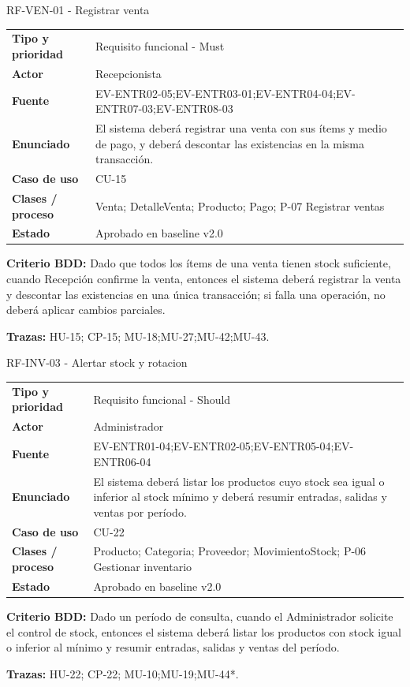 \begin{reqbox}{RF-VEN-01 - Registrar venta}
\begin{tabularx}{\textwidth}{>{\bfseries}p{3.2cm}Y}
Tipo y prioridad & Requisito funcional - Must \\
Actor & Recepcionista \\
Fuente & EV-ENTR02-05;EV-ENTR03-01;EV-ENTR04-04;EV-ENTR07-03;EV-ENTR08-03 \\
Enunciado & El sistema deberá registrar una venta con sus ítems y medio de pago, y deberá descontar las existencias en la misma transacción. \\
Caso de uso & CU-15 \\
Clases / proceso & Venta; DetalleVenta; Producto; Pago; P-07 Registrar ventas \\
Estado & Aprobado en baseline v2.0 \\
\end{tabularx}
\textbf{Criterio BDD:} Dado que todos los ítems de una venta tienen stock suficiente, cuando Recepción confirme la venta, entonces el sistema deberá registrar la venta y descontar las existencias en una única transacción; si falla una operación, no deberá aplicar cambios parciales.

\textbf{Trazas:} HU-15; CP-15; MU-18;MU-27;MU-42;MU-43.
\end{reqbox}


\begin{reqbox}{RF-INV-03 - Alertar stock y rotacion}
\begin{tabularx}{\textwidth}{>{\bfseries}p{3.2cm}Y}
Tipo y prioridad & Requisito funcional - Should \\
Actor & Administrador \\
Fuente & EV-ENTR01-04;EV-ENTR02-05;EV-ENTR05-04;EV-ENTR06-04 \\
Enunciado & El sistema deberá listar los productos cuyo stock sea igual o inferior al stock mínimo y deberá resumir entradas, salidas y ventas por período. \\
Caso de uso & CU-22 \\
Clases / proceso & Producto; Categoria; Proveedor; MovimientoStock; P-06 Gestionar inventario \\
Estado & Aprobado en baseline v2.0 \\
\end{tabularx}
\textbf{Criterio BDD:} Dado un período de consulta, cuando el Administrador solicite el control de stock, entonces el sistema deberá listar los productos con stock igual o inferior al mínimo y resumir entradas, salidas y ventas del período.

\textbf{Trazas:} HU-22; CP-22; MU-10;MU-19;MU-44*.
\end{reqbox}


